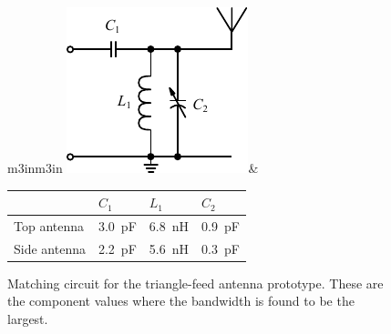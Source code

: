 \begin{figure}[htbp]
        \centering
        \begin{tabular}{m{3in}m{3in}}
            \centering
            \includegraphics{img/tech_sol/schematic_tuning_1}&
            \centering
            \footnotesize
            \begin{tabular}{|l|l|l|l|}
                \hline
                & $C_1$ & $L_1$ & $C_2$ \\
                \hline
                Top antenna & \SI{3.0}{pF} & \SI{6.8}{nH} & \SI{0.9}{pF} \\
                Side antenna & \SI{2.2}{pF} & \SI{5.6}{nH} & \SI{0.3}{pF} \\
                \hline
            \end{tabular}
        \end{tabular}
    \caption{Matching circuit for the triangle-feed antenna prototype. These are the component values where the bandwidth is found to be the largest.}
    \label{fig:triang_proto_matching}
\end{figure}
